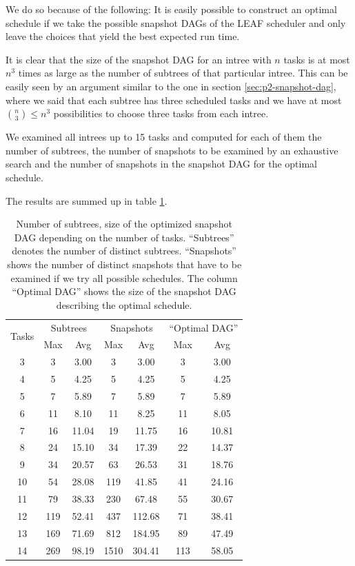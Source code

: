 We do so because of the following: It is easily possible to construct an optimal schedule if we take the possible snapshot DAGs of the LEAF scheduler and only leave the choices that yield the best expected run time.

It is clear that the size of the snapshot DAG for an intree with $n$ tasks is at most $n^3$ times as large as the number of subtrees of that particular intree. This can be easily seen by an argument similar to the one in section \ref{sec:p2-snapshot-dag}, where we said that each subtree has three scheduled tasks and we have at most $\binom{n}{3} \leq n^3$ possibilities to choose three tasks from each intree.

We examined all intrees up to 15 tasks and computed for each of them the number of subtrees, the number of snapshots to be examined by an exhaustive search and the number of snapshots in the snapshot DAG for the optimal schedule.

The results are summed up in table \ref{tab:num-subtrees-size-of-dags}.

\begin{table}[ht]
  \centering
  \begin{tabular}[ht]{ccccccc}
    \multirow{2}{*}{Tasks} & \multicolumn{2}{c}{Subtrees} & \multicolumn{2}{c}{Snapshots} & \multicolumn{2}{c}{``Optimal DAG''} \\
    & Max & Avg & Max & Avg & Max & Avg \\
    \hline
    3 & 3 & 3.00 & 3 & 3.00 & 3 & 3.00  \\
    4 & 5 & 4.25 & 5 & 4.25 & 5 & 4.25  \\
    5 & 7 & 5.89 & 7 & 5.89 & 7 & 5.89  \\
    6 & 11 & 8.10 & 11 & 8.25 & 11 & 8.05  \\
    7 & 16 & 11.04 & 19 & 11.75 & 16 & 10.81  \\
    8 & 24 &  15.10 & 34 & 17.39 & 22 & 14.37  \\
    9 & 34 &  20.57 & 63 & 26.53 & 31 & 18.76  \\
    10 & 54 &  28.08 & 119 & 41.85 & 41 & 24.16  \\
    11 & 79 &  38.33 & 230 & 67.48 & 55 & 30.67  \\
    12 & 119 & 52.41 & 437 & 112.68 & 71 & 38.41  \\
    13 & 169 &  71.69 & 812 & 184.95 & 89 & 47.49  \\
    14 & 269 &  98.19 & 1510 & 304.41 & 113 & 58.05  \\
  \end{tabular}
  \caption{Number of subtrees, size of the optimized snapshot DAG depending on the number of tasks. ``Subtrees'' denotes the number of distinct subtrees. ``Snapshots'' shows the number of distinct snapshots that have to be examined if we try all possible schedules. The column ``Optimal DAG'' shows the size of the snapshot DAG describing the optimal schedule.}
  \label{tab:num-subtrees-size-of-dags}
\end{table}

